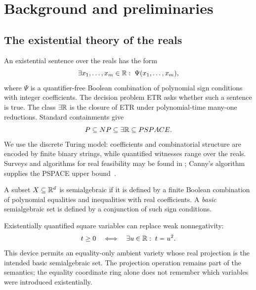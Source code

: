 \section{Background and preliminaries}
\label{sec:preliminaries}

\subsection{The existential theory of the reals}

An existential sentence over the reals has the form
\begin{equation}
  \exists x_1,\ldots,x_m\in\mathbb{R}:\;
  \Psi(x_1,\ldots,x_m),
\end{equation}
where \(\Psi\) is a quantifier-free Boolean combination of polynomial sign
conditions with integer coefficients.  The decision problem ETR asks whether
such a sentence is true.  The class \(\exists\mathbb{R}\) is the closure of ETR under
polynomial-time many-one reductions.  Standard containments give
\begin{equation}
  P\subseteq NP\subseteq\exists\mathbb{R}\subseteq PSPACE.
\end{equation}
We use the discrete Turing model: coefficients and combinatorial structure are
encoded by finite binary strings, while quantified witnesses range over the
reals.  Surveys and algorithms for real feasibility may be found in
\cite{BasuPollackRoy2006,Renegar1992I,SchaeferCardinalMiltzow2024}; Canny's
algorithm supplies the PSPACE upper bound~\cite{Canny1988}.

\begin{definition}
A subset \(X\subseteq\mathbb{R}^d\) is semialgebraic if it is defined by a finite
Boolean combination of polynomial equalities and inequalities with real
coefficients.  A \emph{basic} semialgebraic set is defined by a conjunction of
such sign conditions.
\end{definition}

Existentially quantified square variables can replace weak nonnegativity:
\begin{equation}
  t\geq 0 \quad\Longleftrightarrow\quad \exists u\in\mathbb{R}:\;t=u^2.
  \label{eq:square-slack}
\end{equation}
This device permits an equality-only ambient variety whose real projection is
the intended basic semialgebraic set.  The projection operation remains part of
the semantics; the equality coordinate ring alone does not remember which
variables were introduced existentially.

